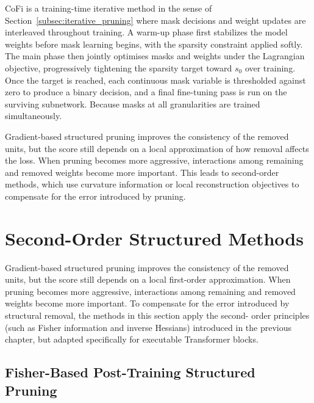 CoFi is a training-time iterative method in the sense of Section~\ref{subsec:iterative_pruning} where mask decisions and weight updates are interleaved throughout training. A warm-up phase first stabilizes the model weights before mask learning begins, with the sparsity constraint applied softly. The main phase then jointly optimises masks and weights under the Lagrangian objective, progressively tightening the sparsity target toward $s_0$ over training. Once the target is reached, each continuous mask variable is thresholded against zero to produce a binary decision, and a final fine-tuning pass is run on the surviving subnetwork. Because masks at all granularities are trained simultaneously.

Gradient-based structured pruning improves the consistency of the removed units, but the score still depends on a local approximation of how removal affects the loss. When pruning becomes more aggressive, interactions among remaining and removed weights become more important. This leads to second-order methods, which use curvature information or local reconstruction objectives to compensate for the error introduced by pruning.



\section{Second-Order Structured Methods}

Gradient-based structured pruning improves the consistency of the removed units, but the score
still depends on a local first-order approximation. When pruning becomes more aggressive,
interactions among remaining and removed weights become more important. To compensate
for the error introduced by structural removal, the methods in this section apply the second-
order principles (such as Fisher information and inverse Hessians) introduced in the previous
chapter, but adapted specifically for executable Transformer blocks.

\subsection{Fisher-Based Post-Training Structured Pruning}


